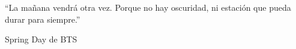 \chapter*{}
\epigraph{“La mañana vendrá otra vez.
Porque no hay oscuridad, ni estación
que pueda durar para siempre.”}{Spring Day de BTS}
